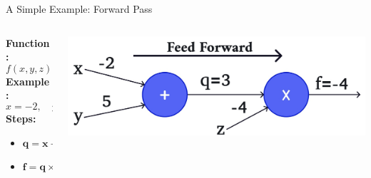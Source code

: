 \documentclass[serif, aspectratio=169]{beamer}
\begin{document}
\begin{frame}{A Simple Example: Forward Pass}

    \begin{columns}
       
        \begin{column}{0.3\textwidth}
            \vspace{-0.4cm} %
            \textbf{Function:} 
            \[
            f(x, y, z) = (x + y)z
            \]
            \textbf{Example:}
            \[
            x = -2, \quad y = 5, \quad z = -4
            \]
            \textbf{Steps:}
            \begin{itemize}
                \item \( \mathbf{q = x + y = 3} \)
                \item \( \mathbf{f = q \times z = -12} \)
            \end{itemize}
        \end{column}

        \begin{column}{0.7\textwidth}
                    \begin{center}
                \includegraphics[width=\textwidth, keepaspectratio]{pic/Conversion output 2.png}
            \end{center}
        \end{column}

    \end{columns}
\end{frame}
\end{document}
